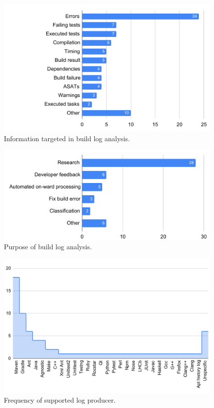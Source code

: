 \begin{figure}[tbhp]
		\centering
		\includegraphics[width=\columnwidth,
		clip]{img/lit-sur/info_target.pdf}
		\caption{Information targeted in build log analysis.}
		\label{fig:litsur:info_target}
\end{figure}

\begin{figure}[tbhp]
		\centering
		\includegraphics[width=\columnwidth,
		clip]{img/lit-sur/use.pdf}
		\caption{Purpose of build log analysis.}
		\label{fig:litsur:use}
\end{figure}

\begin{figure}[tbhp]
		\centering
		\includegraphics[width=\columnwidth,
		clip]{img/lit-sur/log_producer_long-cropped.pdf}
		\caption{Frequency of supported log producer.}
		\label{fig:litsur:log_producer}
\end{figure}

